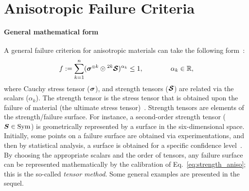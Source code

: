 




\section{Anisotropic Failure Criteria} %
	\paragraph{General mathematical form} A general failure criterion for anisotropic materials can take the following form~\autocite{Goldenblat.1966}:
	\begin{equation}\label{eq:strength_aniso}
		f\equidef \sum_{k=1}^{n}
		(\tenb{\sigma}^\tenpow{k}\odot\tenn{S}{2k})^{\alpha_k} \le 1,\qquad\qquad \alpha_k \in \Real,		
	\end{equation}
	where Cauchy stress tensor ($\tenb{\sigma}$), and strength tensors ($\mathord{\mbox{\boldmath$\mathcal{S}$}}$) are related via the scalars ($\alpha_k$). The strength tensor is the stress tensor that is obtained upon the failure of material (the ultimate stress tensor)~\autocite{Malmeister.1969}. Strength tensors are elements of the strength/failure surface. For instance, a second-order strength tensor ($\tenb{S}\in\symset$) is geometrically represented by a surface in the six-dimensional space. Initially, some points on a failure surface are obtained via experimentations, and then by statistical analysis, a surface is obtained for a specific confidence level~\autocite{Malmeister.1969}. By choosing the appropriate scalars and the order of tensors, any failure surface can be represented mathematically by the calibration of Eq.~\eqref{eq:strength_aniso}; this is the so-called \textit{tensor method}. Some general examples are presented in the sequel.
	
